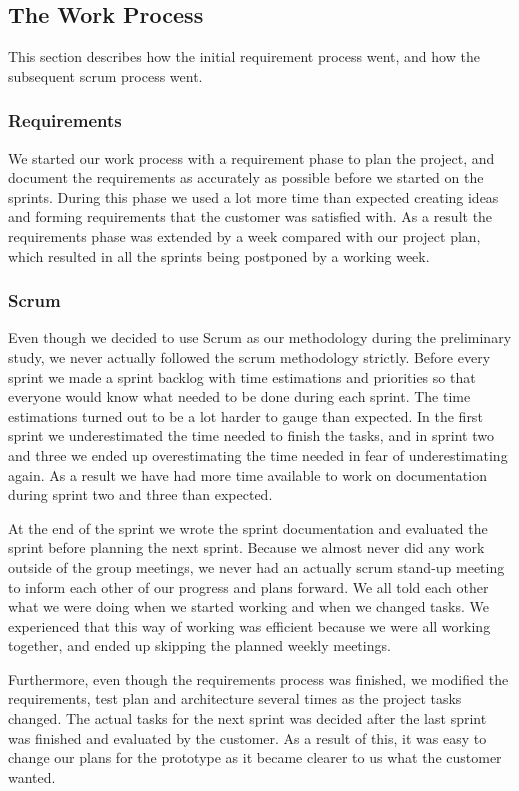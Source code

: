 \documentclass[../document]{subfiles}
\begin{document}
\subsection{The Work Process}
This section describes how the initial requirement process went, and how the subsequent scrum process went. 

\subsubsection{Requirements}
We started our work process with a requirement phase to plan the project, and document the requirements as accurately as possible before we started on the sprints. During this phase we used a lot more time than expected creating ideas and forming requirements that the customer was satisfied with. As a result the requirements phase was extended by a week compared with our project plan, which resulted in all the sprints being postponed by a working week.

\subsubsection{Scrum}
Even though we decided to use Scrum as our methodology during the preliminary study, we never actually followed the scrum methodology strictly. Before every sprint we made a sprint backlog with time estimations and priorities so that everyone would know what needed to be done during each sprint. The time estimations turned out to be a lot harder to gauge than expected. In the first sprint we underestimated the time needed to finish the tasks, and in sprint two and three we ended up overestimating the time needed in fear of underestimating again. As a result we have had more time available to work on documentation during sprint two and three than expected.

At the end of the sprint we wrote the sprint documentation and evaluated the sprint before planning the next sprint. Because we almost never did any work outside of the group meetings, we never had an actually scrum stand-up meeting to inform each other of our progress and plans forward. We all told each other what we were doing when we started working and when we changed tasks. We experienced that this way of working was efficient because we were all working together, and ended up skipping the planned weekly meetings. 

Furthermore, even though the requirements process was finished, we modified the requirements, test plan and architecture several times as the project tasks changed. The actual tasks for the next sprint was decided after the last sprint was finished and evaluated by the customer. As a result of this, it was easy to change our plans for the prototype as it became clearer to us what the customer wanted.
\end{document}
